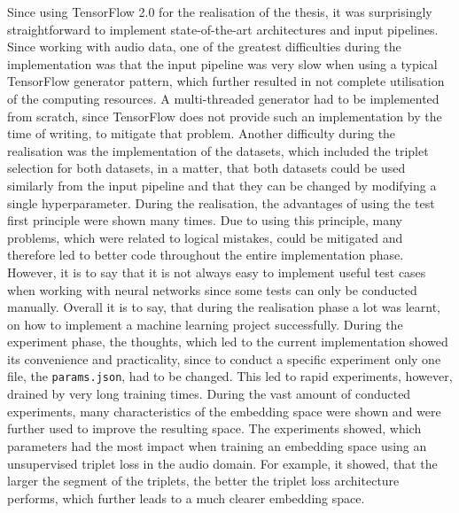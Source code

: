Since using TensorFlow 2.0 for the realisation of the thesis, it was surprisingly straightforward to implement state-of-the-art architectures and input pipelines. Since working with audio data, one of the greatest difficulties during the implementation was that the input pipeline was very slow when using a typical TensorFlow generator pattern, which further resulted in not complete utilisation of the computing resources. A multi-threaded generator had to be implemented from scratch, since TensorFlow does not provide such an implementation by the time of writing, to mitigate that problem. Another difficulty during the realisation was the implementation of the datasets, which included the triplet selection for both datasets, in a matter, that both datasets could be used similarly from the input pipeline and that they can be changed by modifying a single hyperparameter. During the realisation, the advantages of using the test first principle were shown many times. Due to using this principle, many problems, which were related to logical mistakes, could be mitigated and therefore led to better code throughout the entire implementation phase. However, it is to say that it is not always easy to implement useful test cases when working with neural networks since some tests can only be conducted manually. Overall it is to say, that during the realisation phase a lot was learnt, on how to implement a machine learning project successfully.
\newline
\newline
During the experiment phase, the thoughts, which led to the current implementation showed its convenience and practicality, since to conduct a specific experiment only one file, the \texttt{params.json}, had to be changed. This led to rapid experiments, however, drained by very long training times. During the vast amount of conducted experiments, many characteristics of the embedding space were shown and were further used to improve the resulting space. The experiments showed, which parameters had the most impact when training an embedding space using an unsupervised triplet loss in the audio domain. For example, it showed, that the larger the segment of the triplets, the better the triplet loss architecture performs, which further leads to a much clearer embedding space.
\newline
\newline
